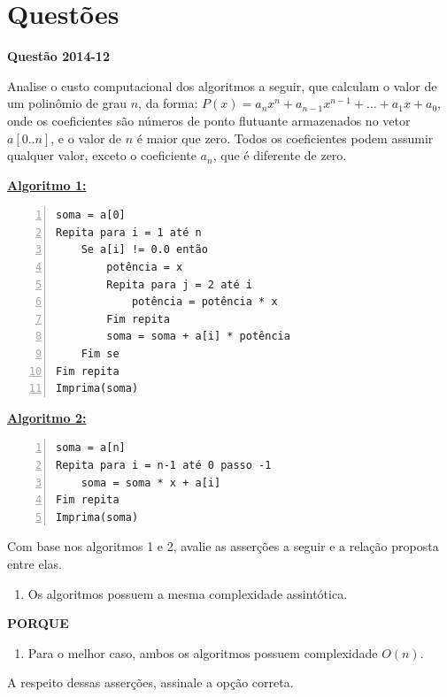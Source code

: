 \documentclass[12pt,a4paper]{article}
\newenvironment{question}[1]{%
    \pdfbookmark[2]{#1}{q:#1}
    \par\medskip\noindent
    \textbf{Questão #1} \dotfill
    \par\medskip\nopagebreak
}{%
    \medskip
}
\newcommand{\listtitle}[1]{%
    \par\medskip\noindent
    {\small\textbf{\underline{#1:}}}
    \par\nopagebreak
}
\begin{document}
\section{Questões}
\begin{question}{2014-12}
\noindent
Analise o custo computacional dos algoritmos a seguir, que calculam o valor de um polinômio de grau $n$, da forma:
$P(x) = a_nx^n + a_{n-1}x^{n-1} + \dots + a_1 x + a_0$,
onde os coeficientes são números de ponto flutuante armazenados no vetor $a[0..n]$, e o valor de $n$ é maior que zero.
Todos os coeficientes podem assumir qualquer valor, exceto o coeficiente $a_n$, que é diferente de zero.

\medskip\noindent\begin{minipage}{\linewidth}
\listtitle{Algoritmo 1}
\begin{Verbatim}[numbers=left]
soma = a[0]
Repita para i = 1 até n
    Se a[i] != 0.0 então
        potência = x
        Repita para j = 2 até i
            potência = potência * x
        Fim repita
        soma = soma + a[i] * potência
    Fim se
Fim repita
Imprima(soma)
\end{Verbatim}

\listtitle{Algoritmo 2}
\begin{Verbatim}[numbers=left]
soma = a[n]
Repita para i = n-1 até 0 passo -1
    soma = soma * x + a[i]
Fim repita
Imprima(soma)
\end{Verbatim}
\medskip
\end{minipage}

\noindent
Com base nos algoritmos 1 e 2, avalie as asserções a seguir e a relação proposta entre elas.

\begin{enumerate}[label=\Roman*.]
    \item Os algoritmos possuem a mesma complexidade assintótica.
\end{enumerate}

\begin{center}
    \textbf{PORQUE}
\end{center}

\begin{enumerate}[label=\Roman*., start=2]
    \item Para o melhor caso, ambos os algoritmos possuem complexidade $O(n)$.
\end{enumerate}

\noindent
A respeito dessas asserções, assinale a opção correta.


\end{question}
\end{document}
